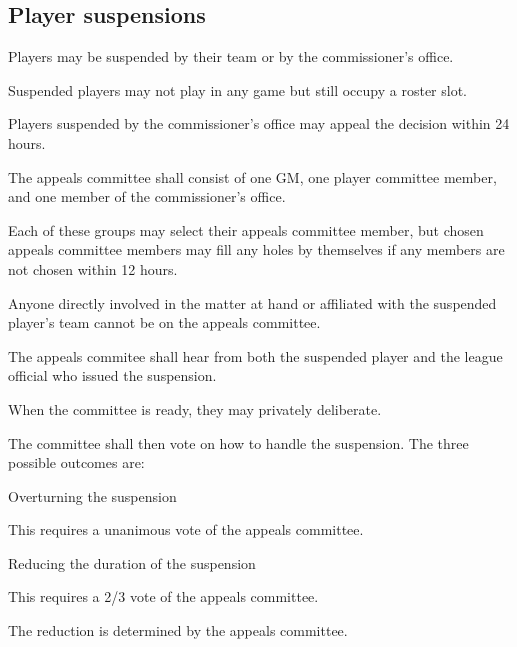 \subsection{Player suspensions}
\begin{deepEnumerate}
	\item Players may be suspended by their team or by the commissioner's office.
	\begin{deepEnumerate}
		\item Suspended players may not play in any game but still occupy a roster slot.
	\end{deepEnumerate}
	\item Players suspended by the commissioner's office may appeal the decision within 24 hours.
	\begin{deepEnumerate}
		\item The appeals committee shall consist of 
		one GM, one player committee member, and one member of the commissioner's office.
		\begin{deepEnumerate}
			\item Each of these groups may select their appeals committee member,
			but chosen appeals committee members may fill any holes by themselves
			if any members are not chosen within 12 hours.
			\item Anyone directly involved in the matter at hand
			or affiliated with the suspended player's team
			cannot be on the appeals committee.
		\end{deepEnumerate}
		\item The appeals commitee shall hear from both the suspended player
		and the league official who issued the suspension.
		\item When the committee is ready, they may privately deliberate.
		\item The committee shall then vote on how to handle the suspension.
		The three possible outcomes are:
		\begin{deepEnumerate}
			\item Overturning the suspension
			\begin{deepEnumerate}
				\item This requires a unanimous vote of the appeals committee.
			\end{deepEnumerate}
			\item Reducing the duration of the suspension
			\begin{deepEnumerate}
				\item This requires a 2/3 vote of the appeals committee.
				\item The reduction is determined by the appeals committee.

\end{deepEnumerate}
\end{deepEnumerate}
\end{deepEnumerate}
\end{deepEnumerate}

